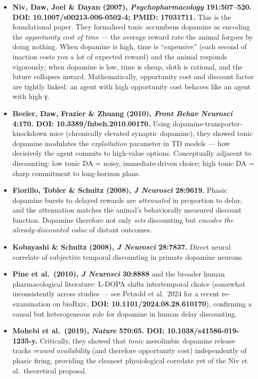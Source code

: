\begin{itemize}
\tightlist
\item
  \textbf{Niv, Daw, Joel \& Dayan (2007), \emph{Psychopharmacology} 191:507--520. DOI: 10.1007/s00213-006-0502-4; PMID: 17031711.} This is the foundational paper. They formalised tonic accumbens dopamine as encoding the \emph{opportunity cost of time} --- the average reward rate the animal forgoes by doing nothing. When dopamine is high, time is ``expensive'' (each second of inaction costs you a lot of expected reward) and the animal responds vigorously; when dopamine is low, time is cheap, sloth is rational, and the future collapses inward. Mathematically, opportunity cost and discount factor are tightly linked: an agent with high opportunity cost behaves like an agent with high γ.
\item
  \textbf{Beeler, Daw, Frazier \& Zhuang (2010), \emph{Front Behav Neurosci} 4:170. DOI: 10.3389/fnbeh.2010.00170.} Using dopamine-transporter-knockdown mice (chronically elevated synaptic dopamine), they showed tonic dopamine modulates the \emph{exploitation} parameter in TD models --- how decisively the agent commits to high-value options. Conceptually adjacent to discounting: low tonic DA = noisy, immediate-driven choice; high tonic DA = sharp commitment to long-horizon plans.
\item
  \textbf{Fiorillo, Tobler \& Schultz (2008), \emph{J Neurosci} 28:9619.} Phasic dopamine bursts to delayed rewards are \emph{attenuated} in proportion to delay, and the attenuation matches the animal's behaviorally measured discount function. Dopamine therefore not only \emph{sets} discounting but \emph{encodes the already-discounted value} of distant outcomes.
\item
  \textbf{Kobayashi \& Schultz (2008), \emph{J Neurosci} 28:7837.} Direct neural correlate of subjective temporal discounting in primate dopamine neurons.
\item
  \textbf{Pine et al.~(2010), \emph{J Neurosci} 30:8888} and the broader human pharmacological literature: L-DOPA shifts intertemporal choice (somewhat inconsistently across studies --- see Petzold et al.~2024 for a recent re-examination on bioRxiv, \textbf{DOI: 10.1101/2024.08.28.610170}), confirming a causal but heterogeneous role for dopamine in human delay discounting.
\item
  \textbf{Mohebi et al.~(2019), \emph{Nature} 570:65. DOI: 10.1038/s41586-019-1235-y.} Critically, they showed that \emph{tonic} mesolimbic dopamine release tracks \emph{reward availability} (and therefore opportunity cost) independently of phasic firing, providing the cleanest physiological correlate yet of the Niv et al.~theoretical proposal.
\end{itemize}

